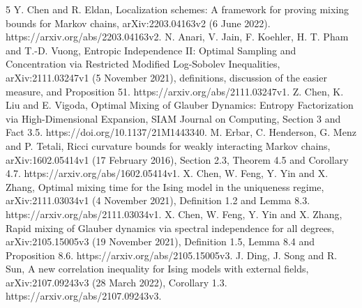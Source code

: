 \documentclass[10pt]{article}
\begin{document}
5 Y. Chen and R. Eldan, Localization schemes: A framework for proving mixing bounds for Markov chains, arXiv:2203.04163v2 (6 June 2022). https://arxiv.org/abs/2203.04163v2. N. Anari, V. Jain, F. Koehler, H. T. Pham and T.-D. Vuong, Entropic Independence II: Optimal Sampling and Concentration via Restricted Modified Log-Sobolev Inequalities, arXiv:2111.03247v1 (5 November 2021), definitions, discussion of the easier measure, and Proposition 51. https://arxiv.org/abs/2111.03247v1. Z. Chen, K. Liu and E. Vigoda, Optimal Mixing of Glauber Dynamics: Entropy Factorization via High-Dimensional Expansion, SIAM Journal on Computing, Section 3 and Fact 3.5. https://doi.org/10.1137/21M1443340. M. Erbar, C. Henderson, G. Menz and P. Tetali, Ricci curvature bounds for weakly interacting Markov chains, arXiv:1602.05414v1 (17 February 2016), Section 2.3, Theorem 4.5 and Corollary 4.7. https://arxiv.org/abs/1602.05414v1. X. Chen, W. Feng, Y. Yin and X. Zhang, Optimal mixing time for the Ising model in the uniqueness regime, arXiv:2111.03034v1 (4 November 2021), Definition 1.2 and Lemma 8.3. https://arxiv.org/abs/2111.03034v1. X. Chen, W. Feng, Y. Yin and X. Zhang, Rapid mixing of Glauber dynamics via spectral independence for all degrees, arXiv:2105.15005v3 (19 November 2021), Definition 1.5, Lemma 8.4 and Proposition 8.6. https://arxiv.org/abs/2105.15005v3. J. Ding, J. Song and R. Sun, A new correlation inequality for Ising models with external fields, arXiv:2107.09243v3 (28 March 2022), Corollary 1.3. https://arxiv.org/abs/2107.09243v3.\par
\end{document}
